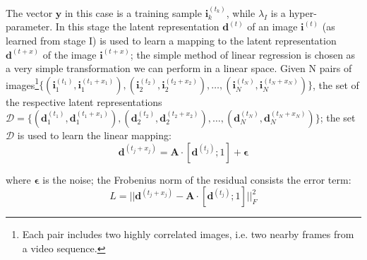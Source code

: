 \documentclass[10pt,twocolumn,letterpaper]{article}
\begin{document}
The vector $\bm{y}$ in this case is a training sample $\bm{i}_k^{(t_k)}$, while $\lambda_{I}$ is a hyper-parameter.
In this stage the latent representation $\bm{d}^{(t)}$ of an image $\bm{i}^{(t)}$ (as learned from stage I) is used to learn a mapping to the latent representation $\bm{d}^{(t + x)}$ of the image $\bm{i}^{(t + x)}$; the simple method of linear regression is chosen as a very simple transformation we can perform in a linear space. Given N pairs of images\footnote{Each pair includes two highly correlated images, i.e. two nearby frames from a video sequence.}$\{(\bm{i}_1^{(t_1)}, \bm{i}_1^{(t_1 + x_1)}), (\bm{i}_2^{(t_2)}, \bm{i}_2^{(t_2 + x_2)}), \ldots, (\bm{i}_N^{(t_N)}, \bm{i}_N^{(t_N + x_N)})\}$, the set of the respective latent representations $\bm{\mathcal{D}} = \{(\bm{d}_1^{(t_1)}, \bm{d}_1^{(t_1 + x_1)}), (\bm{d}_2^{(t_2)}, \bm{d}_2^{(t_2 + x_2)}), \ldots, (\bm{d}_N^{(t_N)}, \bm{d}_N^{(t_N + x_N)})\}$; the set $\bm{\mathcal{D}}$ is used to learn the linear mapping:
\begin{equation}
    \bm{d}^{(t_j + x_j)} = \bm{A}\cdot[\bm{d}^{(t_j)}; 1] + \bm{\epsilon}
\end{equation}

where $\bm{\epsilon}$ is the noise; the Frobenius norm of the residual consists the error term: 
\begin{equation}
    L = ||\bm{d}^{(t_j + x_j)} - \bm{A}\cdot[\bm{d}^{(t_j)}; 1]||_F^2
    \label{eq:linear_dynamics_lin_regr_basic}
\end{equation}
\end{document}
